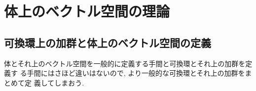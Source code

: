 \documentclass[12pt,twoside]{jarticle}
\begin{document}

\section{体上のベクトル空間の理論}


\subsection{可換環上の加群と体上のベクトル空間の定義}

体とそれ上のベクトル空間を一般的に定義する手間と可換環とそれ上の加群を定義す
る手間にはさほど違いはないので, より一般的な可換環とそれ上の加群をまとめて定
義してしまおう.
\end{document}
